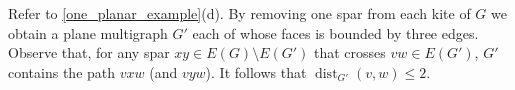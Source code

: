 \documentclass{patmorin}
\newcommand{\note}[2]{\noindent{\color{red}[#1:~#2]}}
\newcommand{\referee}[2]{\noindent\textcolor{blue}{\framebox{\begin{minipage}{\textwidth} Ref \#{#1}: #2\end{minipage}}}}
\DeclareMathOperator{\dist}{dist}
\renewcommand{\le}{\leqslant}
\begin{document}
% 
% 
% 

Refer to \cref{one_planar_example}(d).  By removing one spar from each kite of $G$ we obtain a plane multigraph $G'$ each of whose faces is bounded by three edges.  Observe that, for any spar $xy\in E(G)\setminus E(G')$ that crosses $vw\in E(G')$, $G'$ contains the path $vxw$ (and $vyw$).  It follows that $\dist_{G'}(v,w)\le 2$.
\end{document}

